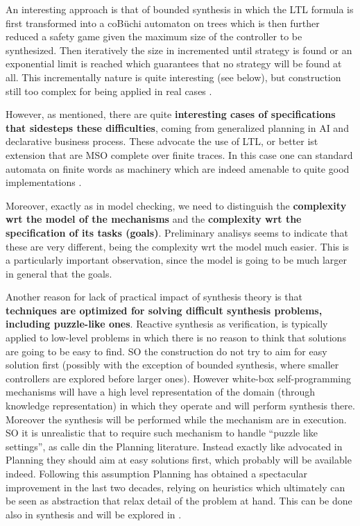 An interesting approach is that of bounded synthesis
\cite{FinkbeinerS13,FiliotJR11,FaymonvilleFRT17} in which the LTL
formula is first transformed into a coB\"uchi automaton on trees
which is then further reduced a safety game given the maximum size of
the controller to be synthesized. Then iteratively the size in
incremented until strategy is found or an exponential limit is reached
which guarantees that no strategy will be found at all. This
incrementally nature is quite interesting (see below), but
construction still too complex for being applied in real cases
\cite{JacobsBBK0KKLNP16}.

However, as mentioned, there are quite \textbf{interesting cases of
specifications that sidesteps these difficulties}, coming from
generalized planning in AI and declarative business process. These
advocate the use of LTL, or better ist extension that are MSO complete
over finite traces. In this case one can standard automata on finite
words as machinery which are indeed amenable to quite good
implementations
\cite{AalstPS09,DeVa13,DeVa15,DeVa16,TorresB15,CamachoTMBM17}.

Moreover, exactly as in model checking, we need to distinguish the \textbf{complexity wrt the model of the mechanisms} and the \textbf{complexity wrt the specification of its tasks (goals)}.  Preliminary analisys seems to indicate that these are very different, being the complexity wrt the model much easier. This is a particularly important observation, since the model is going to be much larger in general that the goals.


Another reason for lack of practical impact
of synthesis theory is that
\textbf{techniques are optimized for solving difficult synthesis problems, including puzzle-like ones}.
Reactive synthesis as verification, is typically applied to low-level
problems in which there is no reason to think that solutions are going
to be easy to find. SO the construction do not try to aim for easy
solution first (possibly with the exception of bounded synthesis,
where smaller controllers are explored before larger ones).  However
white-box self-programming mechanisms will have a high level
representation of the domain (through knowledge representation) in
which they operate and will perform synthesis there. Moreover the
synthesis will be performed while the mechanism are in execution. SO
it is unrealistic that to require such mechanism to handle ``puzzle
like settings'', as calle din the Planning literature. Instead exactly
like advocated in Planning they should aim at easy solutions first,
which probably will be available indeed. Following this assumption
Planning has obtained a spectacular improvement in the last two
decades, relying on heuristics which ultimately can be seen as
abstraction that relax detail of the problem at hand. This can be done
also in synthesis and will be explored in \project.



